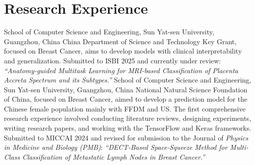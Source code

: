 \documentclass[11pt,a4paper, final]{moderncv}
\begin{document}
\section{\textbf{Research Experience}}%
	{}{}{School of Computer Science and Engineering, Sun Yat-sen University, Guangzhou, China}
	{China Department of Science and Technology Key Grant, focused on Breast Cancer, 
	aims to develop models with clinical interpretability and generalization.}
	{Submitted to ISBI 2025 and currently under review: 
	\emph{“Anatomy-guided Multitask Learning for MRI-based Classification of Placenta Accreta Spectrum and its Subtypes.”}}
	{}{}{School of Computer Science and Engineering, Sun Yat-sen University, Guangzhou, China}
	{National Natural Science Foundation of China, focused on Breast Cancer, 
	aimed to develop a prediction model for the Chinese female population mainly with FFDM and US.}
	{The first comprehensive research experience involved conducting literature reviews, designing experiments, 
	writing research papers, and working with the TensorFlow and Keras frameworks.}
	{Submitted to MICCAI 2024 and revised for submission to the Journal of \emph{Physics in Medicine and Biology (PMB)}: 
	\emph{“DECT-Based Space-Squeeze Method for Multi-Class Classification of Metastatic Lymph Nodes in Breast Cancer.”}}
\end{document}

